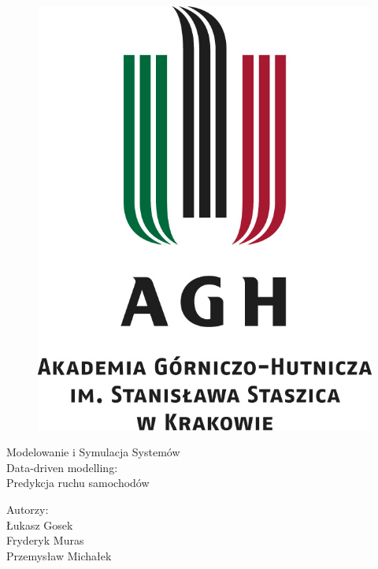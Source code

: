 \documentclass[a4paper,12pt]{article}
\begin{document}
\onehalfspacing

\begin{figure}[!htb]
	\centerline{\includegraphics[scale=0.8]{agh_logo.jpg}}
\end{figure}

\begin{center}
	\Huge{Modelowanie i Symulacja Systemów\\
		Data-driven modelling:\\ Predykcja ruchu samochodów\\}
	\date{}

	\vspace{3cm}
	\Large{	Autorzy:\\
		Łukasz Gosek\\
		Fryderyk Muras\\
		Przemysław Michałek\\}

	\newpage

	
\end{center}
\end{document}
